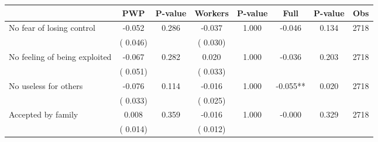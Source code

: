 
\begin{tabular}{l*{7}{c}}\hline&\multicolumn{1}{c}{PWP}&\multicolumn{1}{c}{P-value}&\multicolumn{1}{c}{Workers}&\multicolumn{1}{c}{P-value}&\multicolumn{1}{c}{Full}&\multicolumn{1}{c}{P-value}&\multicolumn{1}{c}{Obs} \\ \hline

 No fear of losing control       &             -0.052       &        0.286  &             -0.037       &        1.000  &             -0.046       &              0.134 &  2718 \\ 
                       &       (       0.046)             &                               &       (       0.030)                     &                               &                                               &                                &                      \\ 

 No feeling of being exploited       &             -0.067       &        0.282  &              0.020       &        1.000  &             -0.036       &              0.203 &  2718 \\ 
                       &       (       0.051)             &                               &       (       0.033)                     &                               &                                               &                                &                      \\ 

 No useless for others       &             -0.076       &        0.114  &             -0.016       &        1.000  &             -0.055**       &              0.020 &  2718 \\ 
                       &       (       0.033)             &                               &       (       0.025)                     &                               &                                               &                                &                      \\ 

 Accepted by family       &              0.008       &        0.359  &             -0.016       &        1.000  &             -0.000       &              0.329 &  2718 \\ 
                       &       (       0.014)             &                               &       (       0.012)                     &                               &                                               &                                &                      \\ 


\end{tabular}
